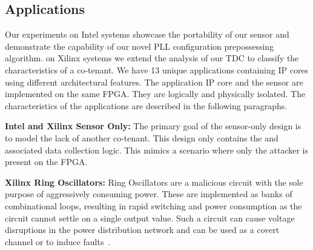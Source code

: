 
\subsection{Applications}
\label{applications}

Our experiments on Intel systems showcase the portability of our sensor and demonstrate the capability of our novel  PLL configuration prepossessing algorithm. on Xilinx systems we extend the analysis of our \name TDC to classify the characteristics of a co-tenant. We have 13 unique applications containing IP cores using different architectural features. The application IP core and the sensor are implemented on the same FPGA. They are logically and physically isolated. The characteristics of the applications are described in the following paragraphs.

\textbf{Intel and Xilinx Sensor Only: } The primary goal of the sensor-only design is to model the lack of another co-tenant. This design only contains the \sensor and associated data collection logic. This mimics a scenario where only the attacker is present on the FPGA.

\textbf{Xilinx Ring Oscillators:}
Ring Oscillators are a malicious circuit with the sole purpose of aggressively consuming power. 
These are implemented as banks of combinational loops, resulting in rapid switching and power consumption as the circuit cannot settle on a single output value. 
Such a circuit can cause voltage disruptions in the power distribution network and can be used as a covert channel or to induce faults~\cite{gnad2017voltage, krautter2018fpgahammer, sugawara2019oscillator}.

